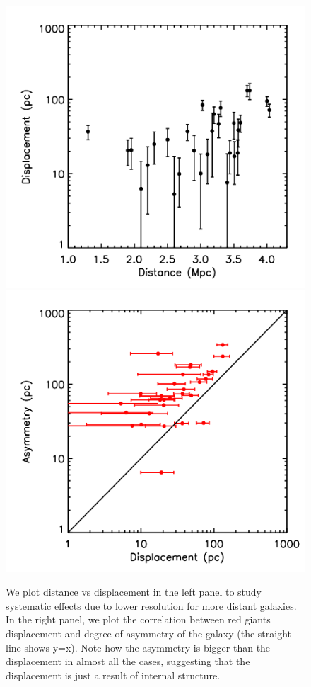\documentclass[twocolappendix, numberedappendix]{emulateapj}
\begin{document}
\begin{figure}
\begin{center}
\includegraphics[scale=0.2]{figures/dispdist.png}
\includegraphics[scale=0.2]{figures/dispdispcm.png}
  \caption{We plot distance vs displacement in the left panel to study systematic
effects due to lower resolution for more distant galaxies.
In the right panel, we plot the
correlation between red giants displacement and degree of asymmetry of the
galaxy (the straight line shows y=x). Note how the asymmetry is bigger than
the displacement in almost all the cases, 
suggesting that the displacement is just a result of internal structure.}
\label{fig:rgsyst}
\end{center}
\end{figure}
\end{document}
